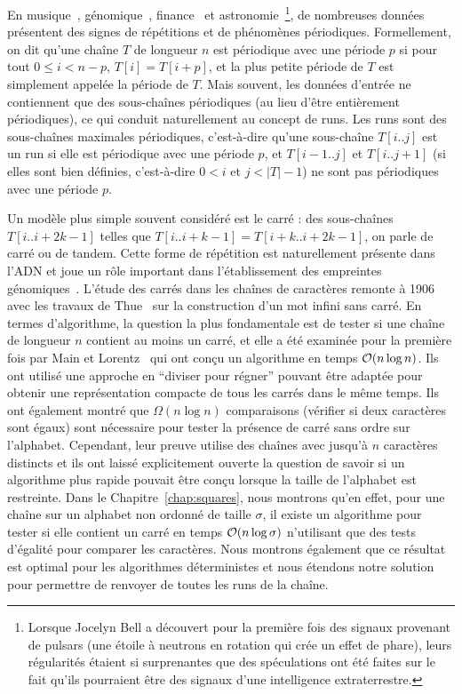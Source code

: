 En musique~\cite{arom1989time}, génomique~\cite{pich2018somatic}, finance~\cite{harvey2007trends} et astronomie~\cite{hewish1979observation}\footnote{ Lorsque Jocelyn Bell a découvert pour la première fois des signaux provenant de pulsars (une étoile à neutrons en rotation qui crée un effet de phare), leurs régularités étaient si surprenantes que des spéculations ont été faites sur le fait qu'ils pourraient être des signaux d'une intelligence extraterrestre.}, de nombreuses données présentent des signes de répétitions et de phénomènes périodiques.
Formellement, on dit qu'une chaîne $T$ de longueur $n$ est périodique avec une période $p$ si pour tout $0 \leq i < n - p$, $T[i]=T[i+p]$, et la plus petite période de $T$ est simplement appelée la période de $T$.
%
Mais souvent, les données d'entrée ne contiennent que des sous-chaînes périodiques (au lieu d'être entièrement périodiques), ce qui conduit naturellement au concept de runs. Les runs sont des sous-chaînes maximales périodiques, c'est-à-dire qu'une sous-chaîne $T[i..j]$ est un run si elle est périodique avec une période $p$, et $T[i-1..j]$ et $T[i..j+1]$ (si elles sont bien définies, c'est-à-dire $0<i$ et $j<|T|-1$) ne sont pas périodiques avec une période $p$. 

Un modèle plus simple souvent considéré est le carré : des sous-chaînes $T[i..i+2k-1]$ telles que $T[i..i+k-1]=T[i+k..i+2k-1]$, on parle de carré ou de tandem. Cette forme de répétition est naturellement présente dans l'ADN et joue un rôle important dans l'établissement des empreintes génomiques~\cite{Kolpakov2003,GYMREK20179}. 
%
L'étude des carrés dans les chaînes de caractères remonte à 1906 avec les travaux de Thue~\cite{thue1906} sur la construction d'un mot infini sans carré. En termes d'algorithme, la question la plus fondamentale est de tester si une chaîne de longueur $n$ contient au moins un carré, et elle a été examinée pour la première fois par Main et Lorentz~\cite{Main1984} qui ont conçu un algorithme en temps $\mathcal{O}(n \log n)$. Ils ont utilisé une approche en ``diviser pour régner'' pouvant être adaptée pour obtenir une représentation compacte de tous les carrés dans le même temps. Ils ont également montré que $\Omega(n\log n)$ comparaisons (vérifier si deux caractères sont égaux) sont nécessaire pour tester la présence de carré sans ordre sur l'alphabet. Cependant, leur preuve utilise des chaînes avec jusqu'à $n$ caractères distincts et ils ont laissé explicitement ouverte la question de savoir si un algorithme plus rapide pouvait être conçu lorsque la taille de l'alphabet est restreinte. 
Dans le Chapitre~\ref{chap:squares}, nous montrons qu'en effet, pour une chaîne sur un alphabet non ordonné de taille $\sigma$, il existe un algorithme pour tester si elle contient un carré en temps $\mathcal{O}(n\log \sigma)$ n'utilisant que des tests d'égalité pour comparer les caractères. Nous montrons également que ce résultat est optimal pour les algorithmes déterministes et nous étendons notre solution pour permettre de renvoyer de toutes les runs de la chaîne.

